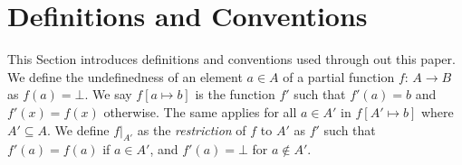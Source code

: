 \section{Definitions and Conventions}
\label{sec:definitions}

This Section introduces definitions and conventions used through out this paper.
We define the undefinedness of an element $a \in A$ of a partial function $f$: $A \rightarrow B$ as
$f(a) = \bot$. We say $f[a \mapsto b]$ is the function $f'$ such that $f'(a) = b$ and
$f'(x) = f(x)$ otherwise. The same applies for all $a \in A'$ in $f[A' \mapsto b]$ where $A' \subseteq A$.
We define $f|_{A'}$ as the \textit{restriction} of $f$ to $A'$ as $f'$ such that
$f'(a) = f(a)$ if $a \in A'$, and $f'(a) = \bot$ for $a \not\in A'$.


\begin{comment}
Introduces terms used in your topic by definitions. Furthermore, it 
can introduce theorems on which parts of your topic base. Hint: Use 
paragraphs to structure your text. This is the first paragraph.

And this is the second paragraph. By the way: Do not use 
abbreviations as don't, it's, or can't. In Figure~\ref{fig:graph} 
you can see an example of a picture embedded in a figure. The
picture is created using the TikZ-Library (cf. 
\href{../manuals/tikzpgfmanual.pdf}{TikZ-Manual}). In Table
\ref{tab:nameOfTheTable} you can see an example for a table.

\begin{definition}[Name of the term]
\label{def:nameOfTerm}
This is how you define a term.
\end{definition}

\begin{theorem}[Name of the theorem]
\label{the:nameOfTheorem}
This is how you write a theorem. Do not forget to prove the theorem.
\begin{proof}
	Here you write the proof of the theorem.
\end{proof}
\end{theorem}


\end{comment}
